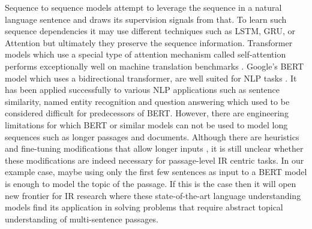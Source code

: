 Sequence to sequence models attempt to leverage the sequence in a natural language sentence and draws its supervision signals from that. To learn such sequence dependencies it may use different techniques such as LSTM, GRU, or Attention \cite{hochreiter1997long, cho2014learning, vaswani2017attention} but ultimately they preserve the sequence information. Transformer models which use a special type of attention mechanism called self-attention performs exceptionally well on machine translation benchmarks \cite{raganato2018analysis}. Google's BERT model which uses a bidirectional transformer, are well suited for NLP tasks \cite{devlin2018bert}. It has been applied successfully to various NLP applications such as sentence similarity, named entity recognition and question answering \cite{yang2019end, miftahutdinov2020biomedical} which used to be considered difficult for predecessors of BERT. However, there are engineering limitations for which BERT or similar models can not be used to model long sequences such as longer passages and documents. Although there are heuristics and fine-tuning modifications that allow longer inputs \cite{pappagari2019hierarchical}, it is still unclear whether these modifications are indeed necessary for passage-level IR centric tasks. In our example case, maybe using only the first few sentences as input to a BERT model is enough to model the topic of the passage. If this is the case then it will open new frontier for IR research where these state-of-the-art language understanding models find its application in solving problems that require abstract topical understanding of multi-sentence passages.


